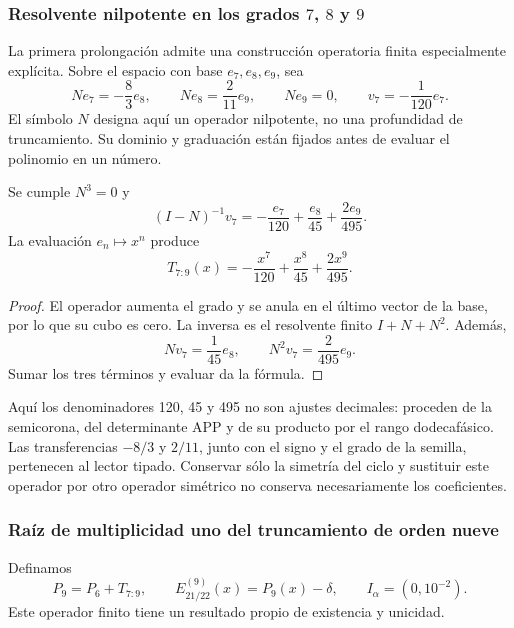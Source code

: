 \subsubsection{Resolvente nilpotente en los grados \(7\), \(8\) y \(9\)}
\label{subsec:alpha-resolvente}

La primera prolongación admite una construcción operatoria finita
especialmente explícita. Sobre el espacio con base \(e_7,e_8,e_9\),
sea
\[
 Ne_7=-\frac83e_8,\qquad Ne_8=\frac2{11}e_9,\qquad Ne_9=0,
 \qquad v_7=-\frac1{120}e_7.
\]
El símbolo \(N\) designa aquí un operador nilpotente, no una profundidad
de truncamiento. Su dominio y graduación están fijados antes de evaluar
el polinomio en un número.

\begin{lemma}
\label{lem:alpha-resolvente}
Se cumple \(N^3=0\) y
\[
 (I-N)^{-1}v_7
 =-\frac{e_7}{120}+\frac{e_8}{45}+\frac{2e_9}{495}.
\]
La evaluación \(e_n\mapsto x^n\) produce
\begin{equation}
 T_{7:9}(x)=-\frac{x^7}{120}+\frac{x^8}{45}+\frac{2x^9}{495}.
 \label{eq:alpha-t79}
\end{equation}
\end{lemma}

\begin{proof}
El operador aumenta el grado y se anula en el último vector de la base,
por lo que su cubo es cero. La inversa es el resolvente finito
\(I+N+N^2\). Además,
\[
 Nv_7=\frac1{45}e_8,\qquad N^2v_7=\frac2{495}e_9.
\]
Sumar los tres términos y evaluar da la fórmula.
\end{proof}

Aquí los denominadores 120, 45 y 495 no son ajustes decimales: proceden
de la semicorona, del determinante APP y de su producto por el rango
dodecafásico. Las transferencias \(-8/3\) y \(2/11\), junto con el
signo y el grado de la semilla, pertenecen al lector tipado. Conservar
sólo la simetría del ciclo y sustituir este operador por otro operador
simétrico no conserva necesariamente los coeficientes.

\subsubsection{Raíz de multiplicidad uno del truncamiento de orden nueve}
\label{subsec:alpha-jet}

Definamos
\[
 P_9=P_6+T_{7:9},\qquad E_{21/22}^{(9)}(x)=P_9(x)-\delta,
 \qquad I_\alpha=(0,10^{-2}).
\]
Este operador finito tiene un resultado propio de existencia y unicidad.

